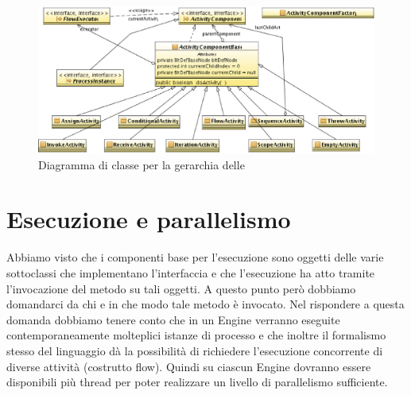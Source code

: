 \begin{figure}[p]
\begin{center}
\includegraphics[angle=90,scale=0.75]
{architettura_interna/dia/actclass}
\caption[Blite-se: Gerarchia delle ActivityComponent]{
   	Diagramma di classe per la gerarchia delle
   	}
  \label{fig:actclass}
\end{center}
\end{figure}

\newpage
\section{Esecuzione e parallelismo}
Abbiamo visto che i componenti base per l'esecuzione sono oggetti delle varie
sottoclassi che implementano l'interfaccia  e che
l'esecuzione ha atto tramite l'invocazione del metodo
 su tali oggetti. A questo punto però dobbiamo
domandarci da chi e in che modo tale metodo è invocato. Nel rispondere a questa
domanda dobbiamo tenere conto che in un Engine verranno eseguite
contemporaneamente molteplici istanze di processo e che inoltre il formalismo
stesso del linguaggio dà la possibilità di richiedere l'esecuzione concorrente
di diverse attività (costrutto flow). Quindi su ciascun Engine dovranno essere
disponibili più thread per poter realizzare un livello di
parallelismo sufficiente.

